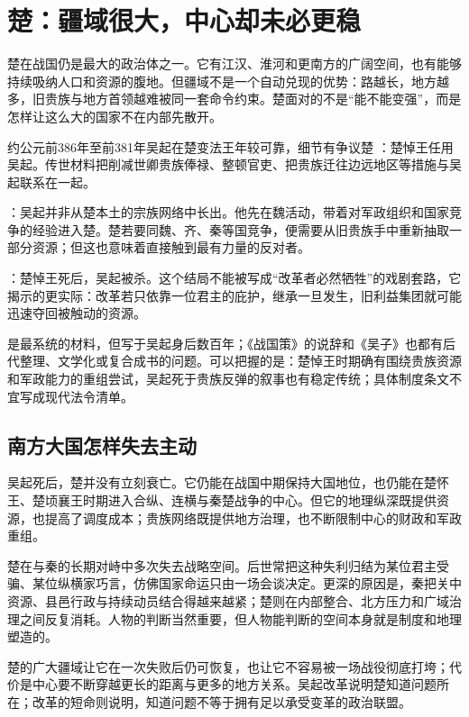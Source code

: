 \section{楚：疆域很大，中心却未必更稳}

楚在战国仍是最大的政治体之一。它有江汉、淮河和更南方的广阔空间，也有能够持续吸纳人口和资源的腹地。但疆域不是一个自动兑现的优势：路越长，地方越多，旧贵族与地方首领越难被同一套命令约束。楚面对的不是“能不能变强”，而是怎样让这么大的国家不在内部先散开。

\begin{event}{约公元前386年至前381年}{吴起在楚变法}{王年较可靠，细节有争议}{楚}
：楚悼王任用吴起。传世材料把削减世卿贵族俸禄、整顿官吏、把贵族迁往边远地区等措施与吴起联系在一起。

：吴起并非从楚本土的宗族网络中长出。他先在魏活动，带着对军政组织和国家竞争的经验进入楚。楚若要同魏、齐、秦等国竞争，便需要从旧贵族手中重新抽取一部分资源；但这也意味着直接触到最有力量的反对者。

：楚悼王死后，吴起被杀。这个结局不能被写成“改革者必然牺牲”的戏剧套路，它揭示的更实际：改革若只依靠一位君主的庇护，继承一旦发生，旧利益集团就可能迅速夺回被触动的资源。
\end{event}

\begin{sourcenote}[吴起在楚的改革能确定多少]
是最系统的材料，但写于吴起身后数百年；《战国策》的说辞和《吴子》也都有后代整理、文学化或复合成书的问题。可以把握的是：楚悼王时期确有围绕贵族资源和军政能力的重组尝试，吴起死于贵族反弹的叙事也有稳定传统；具体制度条文不宜写成现代法令清单。
\end{sourcenote}

\subsection{南方大国怎样失去主动}

吴起死后，楚并没有立刻衰亡。它仍能在战国中期保持大国地位，也仍能在楚怀王、楚顷襄王时期进入合纵、连横与秦楚战争的中心。但它的地理纵深既提供资源，也提高了调度成本；贵族网络既提供地方治理，也不断限制中心的财政和军政重组。

楚在与秦的长期对峙中多次失去战略空间。后世常把这种失利归结为某位君主受骗、某位纵横家巧言，仿佛国家命运只由一场会谈决定。更深的原因是，秦把关中资源、县邑行政与持续动员结合得越来越紧；楚则在内部整合、北方压力和广域治理之间反复消耗。人物的判断当然重要，但人物能判断的空间本身就是制度和地理塑造的。

\begin{turningpoint}
楚的广大疆域让它在一次失败后仍可恢复，也让它不容易被一场战役彻底打垮；代价是中心要不断穿越更长的距离与更多的地方关系。吴起改革说明楚知道问题所在；改革的短命则说明，知道问题不等于拥有足以承受变革的政治联盟。
\end{turningpoint}
